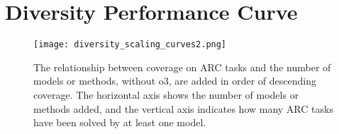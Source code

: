 \section{Diversity Performance Curve}
\label{appendix:X}

\begin{figure}[h]
    \centering
    \texttt{[image: diversity\_scaling\_curves2.png]}
    \caption{The relationship between coverage on ARC tasks and the number of models or methods, without o3, are added in order of descending coverage. The horizontal axis shows the number of models or methods added, and the vertical axis indicates how many ARC tasks have been solved by at least one model.}
    \label{fig:diversity-scaling-curve}
\end{figure}

